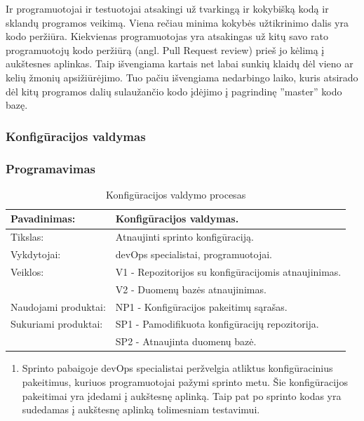\documentclass{VUMIFPSkursinis}
\begin{document}
	\par Ir programuotojai ir testuotojai atsakingi už tvarkingą ir kokybišką kodą ir sklandų programos veikimą. Viena rečiau minima kokybės užtikrinimo dalis yra kodo peržiūra. Kiekvienas programuotojas yra atsakingas už kitų savo rato programuotojų kodo peržiūrą (angl. Pull Request review) prieš jo kėlimą į aukštesnes aplinkas. Taip išvengiama kartais net labai sunkių klaidų dėl vieno ar kelių žmonių apsižiūrėjimo. Tuo pačiu išvengiama nedarbingo laiko, kuris atsirado dėl kitų programos dalių sulaužančio kodo įdėjimo į pagrindinę ''master'' kodo bazę.
	\subsubsection{Konfigūracijos valdymas}
	\subsubsection{Programavimas}
	\begin{center}
		\begin{table}[ht]
		\caption{Konfigūracijos valdymo procesas}
		\begin{tabular}{ | l | l | } 
		\hline
		Pavadinimas:         & Konfigūracijos valdymas.                      \\ \hline
		Tikslas: 	           & Atnaujinti sprinto konfigūraciją.      \\ \hline
		Vykdytojai:          & devOps specialistai, programuotojai.                       \\ \hline
		Veiklos:             & V1 - Repozitorijos su konfigūracijomis atnaujinimas. 									  \\
						             & V2 - Duomenų bazės atnaujinimas. 							 \\ \hline
		Naudojami produktai: & NP1 - Konfigūracijos pakeitimų sąrašas.								 \\ \hline
		Sukuriami produktai: & SP1 - Pamodifikuota konfigūracijų repozitorija. 							  		\\
												 & SP2 - Atnaujinta duomenų bazė. 											 \\  \hline
		\end{tabular}
	\end{table}
		\end{center}
		\begin{enumerate}
			\item Sprinto pabaigoje devOps specialistai peržvelgia atliktus konfigūracinius pakeitimus, kuriuos programuotojai pažymi sprinto metu. Šie konfigūracijos pakeitimai yra įdedami į aukštesnę aplinką. Taip pat po sprinto kodas yra sudedamas į aukštesnę aplinką tolimesniam testavimui.
		\end{enumerate}
\end{document}

